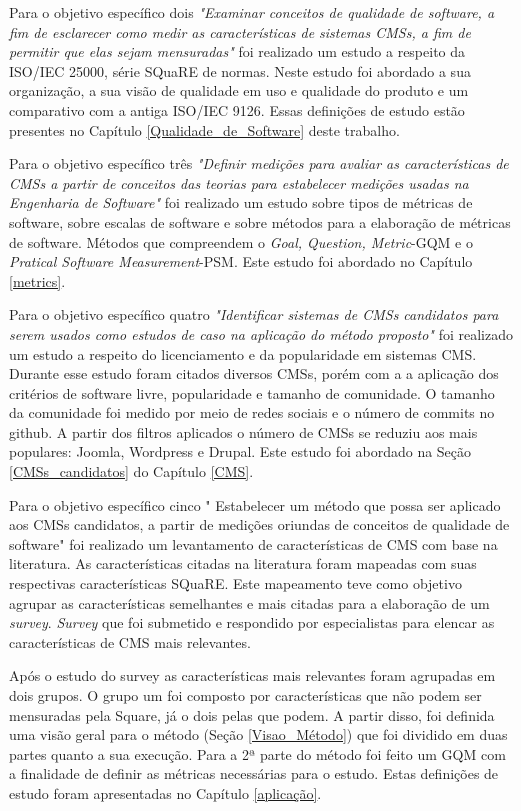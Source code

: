 Para o objetivo específico dois
\textit{"Examinar conceitos de qualidade de software, a fim de esclarecer como medir as características de sistemas CMSs, a fim de permitir que elas sejam mensuradas"} foi realizado um estudo a respeito da ISO/IEC 25000, série SQuaRE de normas. Neste estudo foi abordado a sua organização, a sua visão de qualidade em uso e qualidade do produto e um comparativo com a antiga ISO/IEC 9126. Essas definições de estudo estão presentes no Capítulo \ref{Qualidade_de_Software} deste trabalho.

Para o objetivo específico três 
\textit{"Definir medições para avaliar as características de CMSs a partir de conceitos das teorias para estabelecer medições usadas na Engenharia de Software"} foi realizado um estudo sobre tipos de métricas de software, sobre escalas de software e sobre métodos para a elaboração de métricas de software. Métodos que compreendem o \textit{Goal, Question, Metric}-GQM e o \textit{Pratical Software Measurement}-PSM. Este estudo foi abordado no Capítulo \ref{metrics}.

Para o objetivo específico quatro
\textit{"Identificar sistemas de CMSs candidatos para serem usados como estudos de caso na aplicação do método proposto"} foi realizado um estudo a respeito do licenciamento e da popularidade em sistemas CMS. Durante esse estudo foram citados diversos CMSs, porém com a a aplicação dos critérios de software livre, popularidade e tamanho de comunidade. O tamanho da comunidade foi medido por meio de redes sociais e o número de commits no github. A partir dos filtros aplicados o número de CMSs se reduziu aos mais populares: Joomla, Wordpress e Drupal. Este estudo foi abordado na Seção \ref{CMSs_candidatos} do Capítulo \ref{CMS}. 

Para o objetivo específico cinco
" Estabelecer um método que possa ser aplicado aos CMSs candidatos, a partir de medições oriundas de conceitos de qualidade de software" foi realizado um levantamento de características de CMS com base na literatura. As características citadas na literatura foram mapeadas com suas respectivas características SQuaRE. Este mapeamento teve como objetivo agrupar as características  semelhantes e mais citadas para a elaboração de um \textit{survey}. \textit{Survey} que foi submetido e respondido por especialistas para elencar as características de CMS mais relevantes.

Após o estudo do survey as características mais relevantes foram  agrupadas em dois grupos. O grupo um foi composto por características que não podem ser mensuradas pela Square, já o dois pelas que podem. A partir disso, foi definida uma visão geral para o método (Seção \ref{Visao_Método}) que foi dividido em duas partes quanto a sua execução. Para a 2ª parte do método foi feito um GQM com a finalidade de definir as métricas necessárias para o estudo. Estas definições de estudo foram apresentadas no Capítulo \ref{aplicação}.

